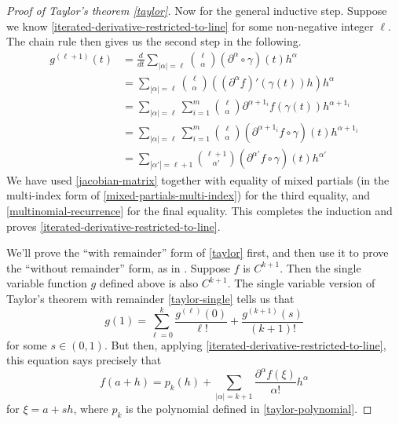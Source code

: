 \begin{proof}[Proof of Taylor's theorem \ref{taylor}]
	Now for the general inductive step. Suppose we know \cref{iterated-derivative-restricted-to-line} for some non-negative integer $\ell$. The chain rule then gives us the second step in the following. 
	\[ \begin{aligned} g^{(\ell+1)}(t) &= \frac{d}{dt} \sum_{|\alpha| = \ell} \binom{\ell}{\alpha} (\partial^\alpha \circ \gamma)(t) h^\alpha \\
	&= \sum_{|\alpha| = \ell} \binom{\ell}{\alpha} \left( (\partial^\alpha f)'(\gamma(t)) h \right) h^\alpha \\
	&= \sum_{|\alpha| = \ell} \sum_{i = 1}^m \binom{\ell}{\alpha} \partial^{\alpha + 1_i} f(\gamma(t)) h^{\alpha + 1_i} \\
	&= \sum_{|\alpha| = \ell} \sum_{i = 1}^m \binom{\ell}{\alpha} (\partial^{\alpha + 1_i} f \circ \gamma)(t) h^{\alpha + 1_i} \\
	&= \sum_{|\alpha'| = \ell + 1} \binom{\ell + 1}{\alpha'} (\partial^{\alpha'}f \circ \gamma)(t) h^{\alpha'}  \end{aligned} \]
	We have used \cref{jacobian-matrix} together with equality of mixed partials (in the multi-index form of \cref{mixed-partials-multi-index}) for the third equality, and \cref{multinomial-recurrence} for the final equality. This completes the induction and proves \cref{iterated-derivative-restricted-to-line}. 
	
	We'll prove the ``with remainder'' form of \cref{taylor} first, and then use it to prove the ``without remainder'' form, as in \cite[section 2.4]{konigsberger}. Suppose $f$ is $C^{k+1}$. Then the single variable function $g$ defined above is also $C^{k+1}$. The single variable version of Taylor's theorem with remainder \ref{taylor-single} tells us that
	\[ g(1) = \sum_{\ell = 0}^k \frac{g^{(\ell)}(0)}{\ell!} + \frac{g^{(k+1)}(s)}{(k+1)!} \]
	for some $s \in (0,1)$. But then, applying \cref{iterated-derivative-restricted-to-line}, this equation says precisely that 
	\[ f(a+h) = p_k(h) + \sum_{|\alpha| = k+1} \frac{\partial^{\alpha} f(\xi)}{\alpha!} h^\alpha \]
	for $\xi = a + sh$, where $p_k$ is the polynomial defined in \cref{taylor-polynomial}. 
	

\end{proof}

